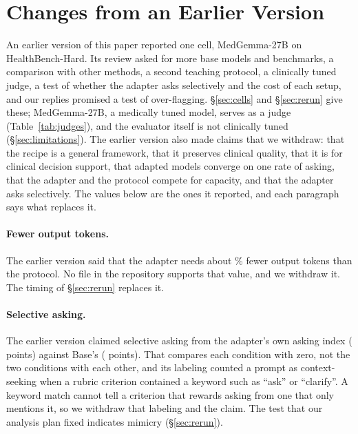 \documentclass{article}
\newcommand{\hbhard}{HealthBench-Hard}
\begin{document}
\section{Changes from an Earlier Version}
\label{app:changes}

An earlier version of this paper reported one cell, MedGemma-27B on \hbhard{}. Its review asked
for more base models and benchmarks, a comparison with other methods, a second teaching protocol,
a clinically tuned judge, a test of whether the adapter asks selectively and the cost of each
setup, and our replies promised a test of over-flagging. \S\ref{sec:cells} and \S\ref{sec:rerun}
give these; MedGemma-27B, a medically tuned model, serves as a judge (Table~\ref{tab:judges}), and
the evaluator itself is not clinically tuned (\S\ref{sec:limitations}). The earlier version also made claims that we
withdraw: that the recipe is a general framework, that it preserves clinical quality, that it is
for clinical decision support, that adapted models converge on one rate of asking, that the
adapter and the protocol compete for capacity, and that the adapter asks selectively. The values
below are the ones it reported, and each paragraph says what replaces it.

\paragraph{Fewer output tokens.} The earlier version said that the adapter needs about
\statPostedFewerTokensPct\% fewer output tokens than the protocol. No file in the repository
supports that value, and we withdraw it. The timing of \S\ref{sec:rerun} replaces it.

\paragraph{Selective asking.} The earlier version claimed selective asking from the adapter's own
asking index (\statPostedDiscriminationLoRA{} points) against Base's
(\statPostedDiscriminationBase{} points). That compares each condition with zero, not the two
conditions with each other, and its labeling counted a prompt as context-seeking when a rubric
criterion contained a keyword such as ``ask'' or ``clarify''. A keyword match cannot tell a
criterion that rewards asking from one that only mentions it, so we withdraw that labeling and the
claim. The test that our analysis plan fixed indicates mimicry (\S\ref{sec:rerun}).
\end{document}

